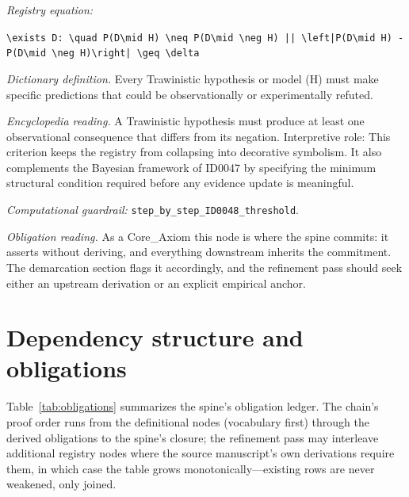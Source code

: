 \documentclass[11pt]{article}
\theoremstyle{remark}
\begin{document}
\noindent\textit{Registry equation:}\par
{\small\texttt{\textbackslash{}exists D: \textbackslash{}quad P(D\textbackslash{}mid H) \textbackslash{}neq P(D\textbackslash{}mid \textbackslash{}neg H) || \textbackslash{}left|P(D\textbackslash{}mid H) - P(D\textbackslash{}mid \textbackslash{}neg H)\textbackslash{}right| \textbackslash{}geq \textbackslash{}delta}}\par\medskip
\noindent\textit{Dictionary definition.} Every Trawinistic hypothesis or model (H) must make specific predictions that could be observationally or experimentally refuted.\par\medskip
\noindent\textit{Encyclopedia reading.} A Trawinistic hypothesis must produce at least one observational consequence that differs from its negation. Interpretive role: This criterion keeps the registry from collapsing into decorative symbolism. It also complements the Bayesian framework of ID0047 by specifying the minimum structural condition required before any evidence update is meaningful.
\par\medskip\noindent\textit{Computational guardrail:} \texttt{step\_by\_step\_ID0048\_threshold}.
\par\medskip\noindent\textit{Obligation reading.} As a Core\_Axiom this node is where the spine commits: it asserts without deriving, and everything downstream inherits the commitment. The demarcation section flags it accordingly, and the refinement pass should seek either an upstream derivation or an explicit empirical anchor.

\section{Dependency structure and obligations}
\label{sec:dep}

Table~\ref{tab:obligations} summarizes the spine's obligation ledger. The chain's proof order runs from the definitional nodes (vocabulary first) through the derived obligations to the spine's closure; the refinement pass may interleave additional registry nodes where the source manuscript's own derivations require them, in which case the table grows monotonically---existing rows are never weakened, only joined.
\end{document}
